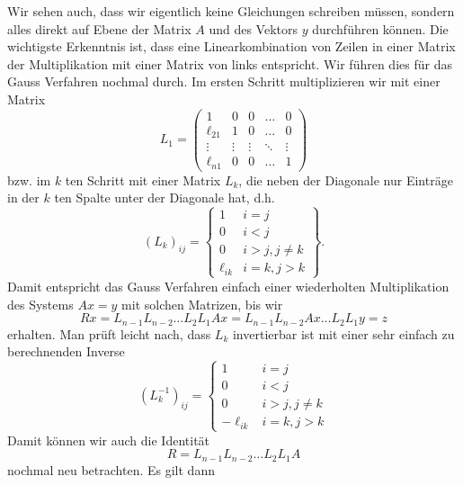 \documentclass[letterpaper,10pt,english]{jupyterBook}
\begin{document}
Wir sehen auch, dass wir eigentlich keine Gleichungen schreiben müssen, sondern alles direkt auf Ebene der Matrix \(A\) und des Vektors \(y\) durchführen können. Die wichtigste Erkenntnis ist, dass eine Linearkombination von Zeilen in einer Matrix der Multiplikation mit einer Matrix von links entspricht. Wir führen dies für das Gauss Verfahren nochmal durch. Im ersten Schritt multiplizieren wir mit einer Matrix
\begin{equation*}
L_1 = \left( \begin{matrix} 1 & 0 & 0 & \ldots & 0 \\ \ell_{21} & 1 & 0 &\ldots & 0 \\
\vdots & \vdots & \vdots & \ddots & \vdots \\ \ell_{n1} & 0 & 0 & \ldots & 1 \end{matrix} \right)
\end{equation*}
bzw. im \(k\) ten Schritt mit einer Matrix \(L_k\), die neben der Diagonale nur Einträge in der \(k\) ten Spalte unter der Diagonale hat, d.h.
\begin{equation*}
(L_k)_{ij} = \left\{ 
\begin{matrix} 
1 & i=j \\ 0 & i < j \\ 
0 & i > j, j \neq k \\ 
\ell_{ik} & i=k,j >k
\end{matrix}
\right\}.
\end{equation*}
Damit entspricht das Gauss Verfahren einfach einer wiederholten Multiplikation des Systems \(Ax=y\) mit solchen Matrizen, bis wir
\begin{equation*}
 Rx = L_{n-1} L_{n-2} \ldots L_2 L_1 A x = L_{n-1} L_{n-2} Ax  \ldots L_2 L_1 y = z
\end{equation*}
erhalten. Man prüft leicht nach, dass \(L_k\) invertierbar ist mit einer sehr einfach zu berechnenden Inverse
\begin{equation*}
(L_k^{-1})_{ij} = \left\{ \begin{matrix} 1 & i=j \\ 0 & i < j \\ 0 & i > j, j \neq k \\ - \ell_{ik} & i=k,j > k\end{matrix}\right.
\end{equation*}
Damit können wir auch die Identität
\begin{equation*}
  R  = L_{n-1} L_{n-2} \ldots L_2 L_1 A
\end{equation*}
nochmal neu betrachten. Es gilt dann
\end{document}
